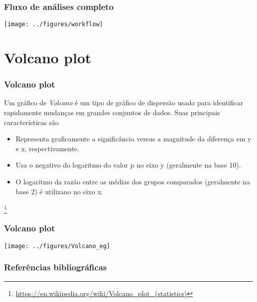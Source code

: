 \documentclass{beamer}
\newcommand\blfootnote[1]{%
  \begingroup
  \renewcommand\thefootnote{}\footnote{#1}%
  \addtocounter{footnote}{-1}%
  \endgroup
}
\begin{document}
\begin{frame}
\frametitle{Fluxo de análises completo}

\begin{center}\texttt{[image: ../figures/workflow]} \end{center}
\end{frame}

\section{Volcano plot}
\begin{frame}
\frametitle{Volcano plot}
Um gráfico de \textit{Volcano} é um tipo de gráfico de dispersão usado para identificar rapidamente mudanças em grandes conjuntos de dados. Suas principais características são

\begin{itemize}
\item Representa graficamente a significância versus a magnitude da diferença em y e x, respectivamente.
\item Usa o negativo do logaritmo do valor p no eixo y (geralmente na base 10).
\item O logaritmo da razão entre as médias dos grupos comparados (geralmente na base 2) é utilizano no eixo x. 
\end{itemize}

\blfootnote{\url{https://en.wikipedia.org/wiki/Volcano_plot_(statistics)}}
\end{frame}

\begin{frame}
\frametitle{Volcano plot}

\begin{center}\texttt{[image: ../figures/Volcano\_eg]} \end{center}
\end{frame}

\begin{frame}
\frametitle{Referências bibliográficas}
\printbibliography
\end{frame}
\end{document}
